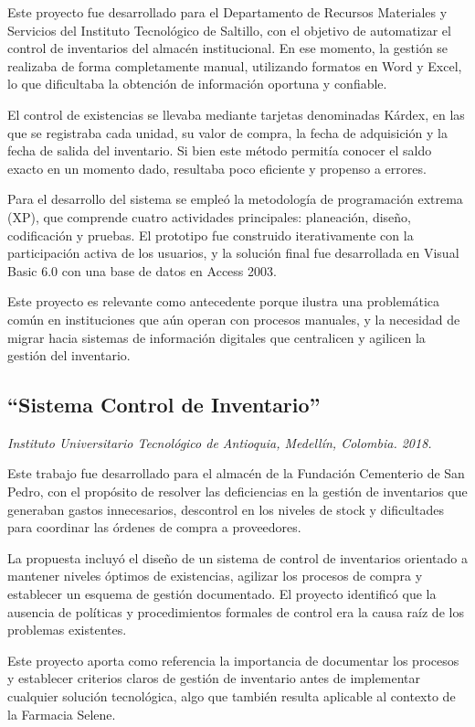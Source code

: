 Este proyecto fue desarrollado para el Departamento de Recursos Materiales y Servicios del Instituto Tecnológico de Saltillo, con el objetivo de automatizar el control de inventarios del almacén institucional. En ese momento, la gestión se realizaba de forma completamente manual, utilizando formatos en Word y Excel, lo que dificultaba la obtención de información oportuna y confiable.

El control de existencias se llevaba mediante tarjetas denominadas Kárdex, en las que se registraba cada unidad, su valor de compra, la fecha de adquisición y la fecha de salida del inventario. Si bien este método permitía conocer el saldo exacto en un momento dado, resultaba poco eficiente y propenso a errores.

Para el desarrollo del sistema se empleó la metodología de programación extrema (XP), que comprende cuatro actividades principales: planeación, diseño, codificación y pruebas. El prototipo fue construido iterativamente con la participación activa de los usuarios, y la solución final fue desarrollada en Visual Basic 6.0 con una base de datos en Access 2003.

Este proyecto es relevante como antecedente porque ilustra una problemática común en instituciones que aún operan con procesos manuales, y la necesidad de migrar hacia sistemas de información digitales que centralicen y agilicen la gestión del inventario.


\subsection{``Sistema Control de Inventario''}
\textit{Instituto Universitario Tecnológico de Antioquia, Medellín, Colombia. 2018.}

Este trabajo fue desarrollado para el almacén de la Fundación Cementerio de San Pedro, con el propósito de resolver las deficiencias en la gestión de inventarios que generaban gastos innecesarios, descontrol en los niveles de stock y dificultades para coordinar las órdenes de compra a proveedores.

La propuesta incluyó el diseño de un sistema de control de inventarios orientado a mantener niveles óptimos de existencias, agilizar los procesos de compra y establecer un esquema de gestión documentado. El proyecto identificó que la ausencia de políticas y procedimientos formales de control era la causa raíz de los problemas existentes.

Este proyecto aporta como referencia la importancia de documentar los procesos y establecer criterios claros de gestión de inventario antes de implementar cualquier solución tecnológica, algo que también resulta aplicable al contexto de la Farmacia Selene.


